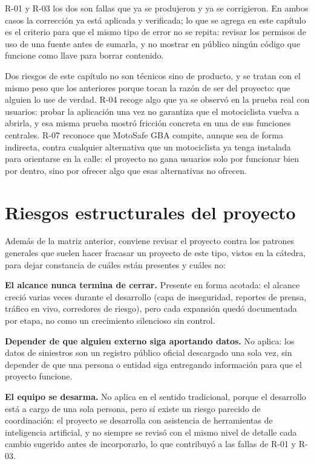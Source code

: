 R-01 y R-03 los dos son fallas que ya se produjeron y ya se corrigieron.
En ambos casos la corrección ya está aplicada y verificada; lo que se
agrega en este capítulo es el criterio para que el mismo tipo de error
no se repita: revisar los permisos de uso de una fuente antes de
sumarla, y no mostrar en público ningún código que funcione como llave
para borrar contenido.

Dos riesgos de este capítulo no son técnicos sino de producto, y se
tratan con el mismo peso que los anteriores porque tocan la razón de ser
del proyecto: que alguien lo use de verdad. R-04 recoge algo que ya se
observó en la prueba real con usuarios: probar la aplicación una vez no
garantiza que el motociclista vuelva a abrirla, y esa misma prueba
mostró fricción concreta en una de sus funciones centrales. R-07
reconoce que MotoSafe GBA compite, aunque sea de forma indirecta, contra
cualquier alternativa que un motociclista ya tenga instalada para
orientarse en la calle: el proyecto no gana usuarios solo por funcionar
bien por dentro, sino por ofrecer algo que esas alternativas no ofrecen.

\section{Riesgos estructurales del proyecto}

Además de la matriz anterior, conviene revisar el proyecto contra los
patrones generales que suelen hacer fracasar un proyecto de este tipo,
vistos en la cátedra, para dejar constancia de cuáles están presentes y
cuáles no:

\textbf{El alcance nunca termina de cerrar.} Presente en forma acotada:
el alcance creció varias veces durante el desarrollo (capa de
inseguridad, reportes de prensa, tráfico en vivo, corredores de riesgo),
pero cada expansión quedó documentada por etapa, no como un crecimiento
silencioso sin control.

\textbf{Depender de que alguien externo siga aportando datos.} No
aplica: los datos de siniestros son un registro público oficial
descargado una sola vez, sin depender de que una persona o entidad siga
entregando información para que el proyecto funcione.

\textbf{El equipo se desarma.} No aplica en el sentido tradicional,
porque el desarrollo está a cargo de una sola persona, pero sí existe un
riesgo parecido de coordinación: el proyecto se desarrolla con
asistencia de herramientas de inteligencia artificial, y no siempre se
revisó con el mismo nivel de detalle cada cambio sugerido antes de
incorporarlo, lo que contribuyó a las fallas de R-01 y R-03.

